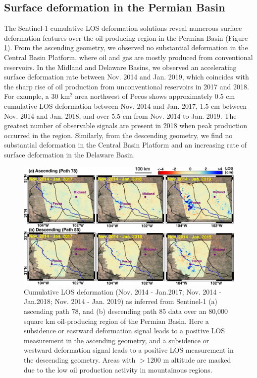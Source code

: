 \documentclass{utexasthesis}
\begin{document}
\subsection{Surface deformation in the Permian Basin}
The Sentinel-1 cumulative LOS deformation solutions reveal numerous surface deformation features over the oil-producing region in the Permian Basin (Figure \ref{fig:insar-los}). From the ascending geometry, we observed no substantial deformation in the Central Basin Platform, where oil and gas are mostly produced from conventional reservoirs. In the Midland and Delaware Basins, we observed an accelerating surface deformation rate between Nov. 2014 and Jan. 2019, which coincides with the sharp rise of oil production from unconventional reservoirs in 2017 and 2018. For example, a 30 km$^2 $ area northwest of Pecos shows approximately 0.5 cm cumulative LOS deformation between Nov. 2014 and Jan. 2017, 1.5 cm between Nov. 2014 and Jan. 2018, and over 5.5 cm from Nov. 2014 to Jan. 2019. The greatest number of observable signals are present in 2018 when peak production occurred in the region. Similarly, from the descending geometry, we find no substantial deformation in the Central Basin Platform and an increasing rate of surface deformation in the Delaware Basin. 


\begin{figure}[hbt!]
	\centering
	\includegraphics[width=.96\linewidth]{paper1-permian/figures/figure3-los-insar.pdf}
	\caption[Cumulative LOS deformation for path 78 and path 85]{Cumulative LOS deformation (Nov. 2014 - Jan.2017; Nov. 2014 - Jan.2018; Nov. 2014 - Jan. 2019) as inferred from Sentinel-1 (a) ascending path 78, and (b) descending path 85 data over an 80,000 square km oil-producing region of the Permian Basin. Here a subsidence or eastward deformation signal leads to a positive LOS measurement in the ascending geometry, and a subsidence or westward deformation signal leads to a positive LOS measurement in the descending geometry. Areas with $>$1200 m altitude are masked due to the low oil production activity in mountainous regions.}
	\label{fig:insar-los}
\end{figure}
\end{document}
